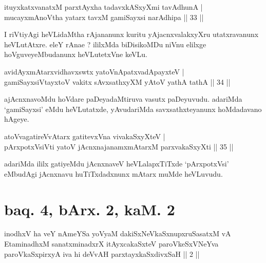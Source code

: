 \begin{shl}
ituyxkatxvanatxM parxtAyxha tadavxkASxyXmi tavAdhunA |\\
mucayxmAnoV\s tha yatarx tavxM gamiSayxsi narAdhipa \hfill || 33 || 
\end{shl}

\begin{artha}
I riVtiyAgi heVLidaMtha rAjananunx kuritu yAjacnxvalakxyXru utatxravanunx heVLutAtxre. eleY rAnae ? ililxMda biDisikoMDu niVnu elilxge hoVguveyeMbudanunx heVLutetxVne keVLu.
\end{artha}


\begin{shl}
avidAyxmAtarxvidhavxswtx yatoV\s nApatxvadApayxteV |\\
gamiSayxsiVtayxtoV vakitx sAvxsathxyXM yAtoV yathA tathA \hfill || 34 || 
\end{shl}

\begin{artha}
ajAcnxnavoMdu hoVdare paDeyadaMtiruva vasutx paDeyuvudu. adariMda `gamiSayxsi' eMdu heVLutatxde, yAvudariMda savxsathxteyanunx hoMdadavano hAgeye.
\end{artha}

\begin{shl}
atoV\s vagatireVvAtarx gatitevxVna vivakaSxyXteV |\\
pArxpotxV\s siVti yatoV jAcnxnajanamxmAtarxM parxvakaSxyXti \hfill || 35 || 
\end{shl}

\begin{artha}
adariMda ililx gatiyeMdu jAcnxnaveV heVLalapxTiTxde `pArxpotxVsi' eMbudAgi jAcnxnavu huTiTxdadxnunx mAtarx muMde heVLuvudu.
\end{artha}


\section*{baq. 4, bArx. 2, kaM. 2}

\begin{shl}
inodhxV ha veY nAmeYSa yoV\s yaM dakiSxNeV\s kaSxnupxruSasatxM vA EtaminadhxM sanatxminadxrX itAyxcakaSxteV paroVkeSxVNeYva paroVkaSxpirxyA iva hi deVvAH parxtayxkaSxdivxSaH || 2 ||
\end{shl}

